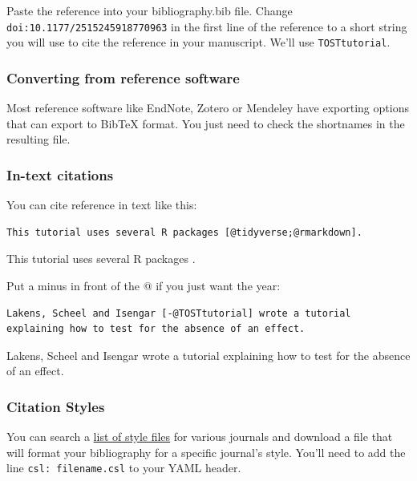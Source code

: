 \documentclass[
  oneside]{book}
\begin{document}
Paste the reference into your bibliography.bib file. Change \texttt{doi:10.1177/2515245918770963} in the first line of the reference to a short string you will use to cite the reference in your manuscript. We'll use \texttt{TOSTtutorial}.

\hypertarget{converting-from-reference-software}{%
\subsubsection{Converting from reference software}\label{converting-from-reference-software}}

Most reference software like EndNote, Zotero or Mendeley have exporting options that can export to BibTeX format. You just need to check the shortnames in the resulting file.

\hypertarget{in-text-citations}{%
\subsubsection{In-text citations}\label{in-text-citations}}

You can cite reference in text like this:

\begin{verbatim}
This tutorial uses several R packages [@tidyverse;@rmarkdown].
\end{verbatim}

This tutorial uses several R packages \citep{tidyverse, rmarkdown}.

Put a minus in front of the @ if you just want the year:

\begin{verbatim}
Lakens, Scheel and Isengar [-@TOSTtutorial] wrote a tutorial explaining how to test for the absence of an effect.
\end{verbatim}

Lakens, Scheel and Isengar \citeyearpar{TOSTtutorial} wrote a tutorial explaining how to test for the absence of an effect.

\hypertarget{citation-styles}{%
\subsubsection{Citation Styles}\label{citation-styles}}

You can search a \href{https://www.zotero.org/styles}{list of style files} for various journals and download a file that will format your bibliography for a specific journal's style. You'll need to add the line \texttt{csl:\ filename.csl} to your YAML header.
\end{document}
